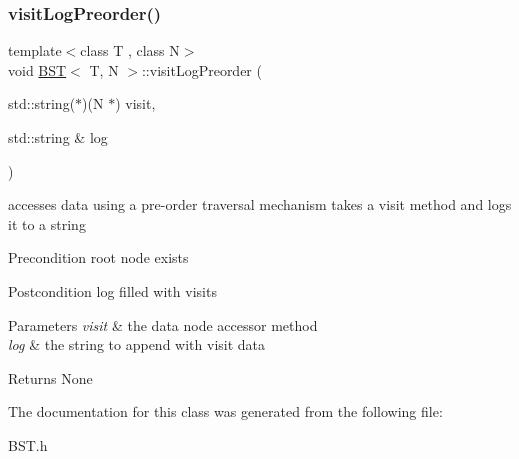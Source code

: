 \subsubsection{\texorpdfstring{visit\+Log\+Preorder()}{visitLogPreorder()}}
{\footnotesize\ttfamily template$<$class T , class N$>$ \\
void \hyperlink{class_b_s_t}{B\+ST}$<$ T, N $>$\+::visit\+Log\+Preorder (\begin{DoxyParamCaption}\item[{std\+::string($\ast$)(N $\ast$)}]{visit,  }\item[{std\+::string \&}]{log }\end{DoxyParamCaption})}

accesses data using a pre-\/order traversal mechanism takes a visit method and logs it to a string \begin{DoxyPrecond}{Precondition}
root node exists 
\end{DoxyPrecond}
\begin{DoxyPostcond}{Postcondition}
log filled with visits 
\end{DoxyPostcond}

\begin{DoxyParams}{Parameters}
{\em visit} & the data node accessor method \\
\hline
{\em log} & the string to append with visit data \\
\hline
\end{DoxyParams}
\begin{DoxyReturn}{Returns}
None 
\end{DoxyReturn}


The documentation for this class was generated from the following file\+:\begin{DoxyCompactItemize}
\item 
B\+S\+T.\+h\end{DoxyCompactItemize}

